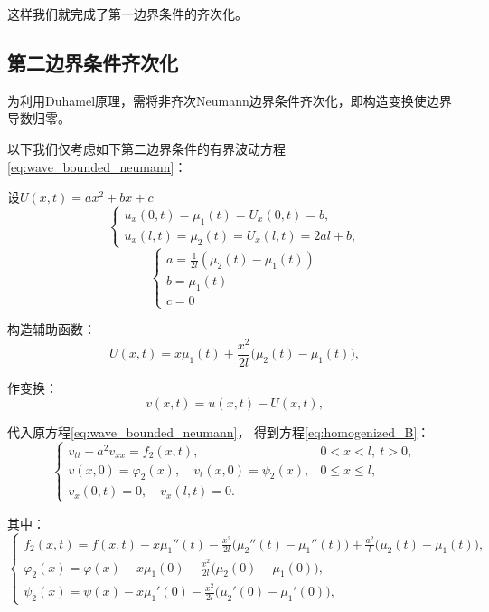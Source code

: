 \documentclass[a4paper, 12pt, oneside]{article} %
\numberwithin{subsection}{section}
\numberwithin{subsubsection}{subsection}
\theoremstyle{plain}
\theoremstyle{definition}
\theoremstyle{remark}
\begin{document}
		这样我们就完成了第一边界条件的齐次化。
		
		\subsection{第二边界条件齐次化}
		为利用Duhamel原理，需将非齐次Neumann边界条件齐次化，即构造变换使边界导数归零。
		
		
		以下我们仅考虑如下第二边界条件的有界波动方程\eqref{eq:wave_bounded_neumann}：
		
		设$U(x, t)=ax^2+bx+c$
		\[
		\begin{cases}
			u_x(0, t) = \mu_1(t) = U_x(0, t) = b, \\
			u_x(l, t) = \mu_2(t) = U_x(l, t) = 2al + b,
		\end{cases}
		\]
		\[
		\begin{cases}
			a = \frac{1}{2l}(\mu_2(t) - \mu_1(t)) \\
			b = \mu_1(t) \\
			c = 0 
		\end{cases}
		\]
		
		构造辅助函数：
		\begin{equation}
			U(x, t) = x\mu_1(t) + \frac{x^2}{2l}\big( \mu_2(t) - \mu_1(t) \big),
		\end{equation}
		
		作变换：
		\begin{equation}
			v(x, t) = u(x, t) - U(x, t),
		\end{equation}
		
		代入原方程\eqref{eq:wave_bounded_neumann}，
		得到方程\eqref{eq:homogenized_B}：
		\begin{equation}\label{eq:homogenized_B}
			\begin{cases}
				v_{tt} - a^2 v_{xx} = f_2(x, t), & 0 < x < l, \ t > 0, \\
				v(x, 0) = \varphi_2(x), \quad v_t(x, 0) = \psi_2(x), & 0 \leq x \leq l, \\
				v_x(0, t) = 0, \quad v_x(l, t) = 0. &
			\end{cases}
		\end{equation}
		
		其中：
		\begin{equation}
			\begin{cases}
				f_2(x, t) = f(x, t)-x\mu_1''(t) - \frac{x^2}{2l}\big( \mu_2''(t) - \mu_1''(t) \big) + \frac{a^2}{l}\big( \mu_2(t) - \mu_1(t) \big), \\
				\varphi_2(x) = \varphi(x) - x\mu_1(0) - \frac{x^2}{2l}\big( \mu_2(0) - \mu_1(0) \big), \\
				\psi_2(x) = \psi(x) - x\mu_1'(0) - \frac{x^2}{2l}\big( \mu_2'(0) - \mu_1'(0) \big), 
			\end{cases}
		\end{equation}
		
\end{document}
